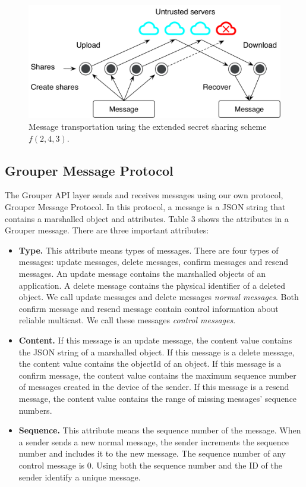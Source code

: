 \documentclass[twocolumn,10pt]{article}
\begin{document}
\begin{figure}[t]
	\centering
	\includegraphics[scale=0.42]{transportation}
	\caption{Message transportation using the extended secret sharing scheme  $f(2, 4, 3)$.}
\end{figure}

\subsection{Grouper Message Protocol}

The Grouper API layer sends and receives messages using our own protocol, Grouper Message Protocol.
In this protocol, a message is a JSON string that contains a marshalled object and attributes.
Table 3 shows the attributes in a Grouper message.
There are three important attributes:

\begin{itemize}
	\setlength{\itemsep}{1pt}
	\setlength{\parskip}{0pt}
	\setlength{\parsep}{0pt}
	\item \textbf{Type.}
	This attribute means types of messages.
	There are four types of messages: update messages, delete messages, confirm messages and resend messages.
	An update message contains the marshalled objects of an application.
	A delete message contains the physical identifier of a deleted object.
	We call update messages and delete messages \emph{normal messages}. 
	Both confirm message and resend message contain control information about reliable multicast. 
	We call these messages \emph{control messages}.
	\item \textbf{Content.} 
	If this message is an update message, the content value contains the JSON string of a marshalled object.
	If this message is a delete message, the content value contains the objectId of an object.
	If this message is a confirm message, the content value contains the maximum sequence number of messages created in the device of the sender.
	If this message is a resend message, the content value contains the range of missing messages' sequence numbers.
	\item \textbf{Sequence.}
	This attribute means the sequence number of the message.
	When a sender sends a new normal message, the sender increments the sequence number and includes it to the new message.
	The sequence number of any control message is 0.
	Using both the sequence number and the ID of the sender identify a unique message.
\end{itemize}
\end{document}

